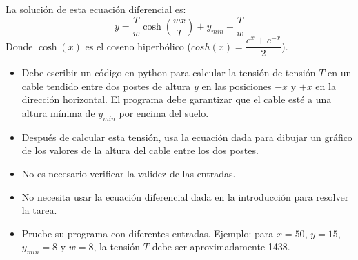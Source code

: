 \documentclass[12pt,letterpaper]{article}
\begin{document}
\begin{enumerate}
La soluci\'on de esta ecuaci\'on diferencial es:
$$
y = \dfrac{T}{w}\cosh\left(\dfrac{wx}{T}\right) + y_{min}-\dfrac{T}{w}
$$
Donde $\cosh(x)$ es el coseno hiperb\'olico ($cosh(x) = \dfrac{e^x + e^{-x}}{2}$).
\begin{itemize}
    \item Debe escribir un c\'odigo en python para calcular la tensi\'on de tensi\'on $T$ en un cable tendido entre dos postes de altura $y$ en las posiciones $-x$ y $+x$ en la dirección horizontal. El programa debe garantizar que el cable est\'e a una altura m\'inima de 
    $y_{min}$ por encima del suelo.
    \item Despu\'es de calcular esta tensi\'on, usa la ecuaci\'on dada para dibujar un gr\'afico de los valores de la altura del cable entre los dos postes.
    \item No es necesario verificar la validez de las entradas.
    \item No necesita usar la ecuaci\'on diferencial dada en la introducci\'on para resolver la tarea.
    \item Pruebe su programa con diferentes entradas. Ejemplo: para $x=50$, $y=15$, $y_{min}=8$ y 
    $w=8$, la tensi\'on $T$ debe ser aproximadamente 1438.
\end{itemize}
\end{enumerate}
\end{document}
